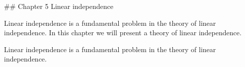 

## Chapter 5 Linear independence

Linear independence is a fundamental problem in the theory of linear independence. In this chapter we will present a theory of linear independence.

Linear independence is a fundamental problem in the theory of linear independence.

